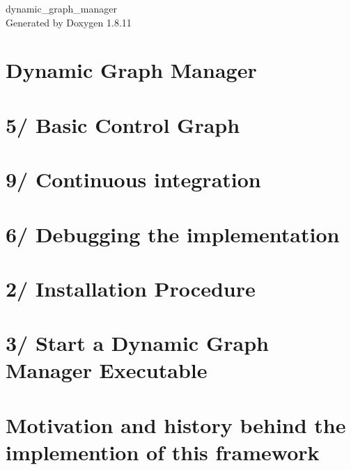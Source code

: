 \documentclass[twoside]{book}
\newcommand{\+}{\discretionary{\mbox{\scriptsize$\hookleftarrow$}}{}{}}
\newcommand{\clearemptydoublepage}{%
  \newpage{\pagestyle{empty}\cleardoublepage}%
}
\begin{document}
\hypersetup{pageanchor=false,
             bookmarksnumbered=true,
             pdfencoding=unicode
            }
\begin{titlepage}
\vspace*{7cm}
\begin{center}%
{\Large dynamic\+\_\+graph\+\_\+manager }\\
\vspace*{1cm}
{\large Generated by Doxygen 1.8.11}\\
\end{center}
\end{titlepage}
\clearemptydoublepage
\tableofcontents
\clearemptydoublepage
{}
\hypersetup{pageanchor=true}

\chapter{Dynamic Graph Manager}
\label{index}\hypertarget{index}{}
\chapter{5/ Basic Control Graph}
\label{subpage_basic_control_graph}
\hypertarget{subpage_basic_control_graph}{}

\chapter{9/ Continuous integration}
\label{subpage_ci}
\hypertarget{subpage_ci}{}

\chapter{6/ Debugging the implementation}
\label{subpage_debugging}
\hypertarget{subpage_debugging}{}

\chapter{2/ Installation Procedure}
\label{subpage_installation}
\hypertarget{subpage_installation}{}

\chapter{3/ Start a Dynamic Graph Manager Executable}
\label{subpage_launch}
\hypertarget{subpage_launch}{}

\chapter{Motivation and history behind the implemention of this framework}
\label{subpage_motivation_history}
\hypertarget{subpage_motivation_history}{}

\end{document}
